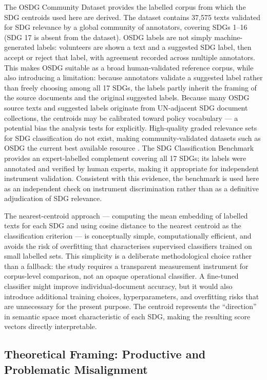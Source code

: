 \documentclass[12pt,a4paper]{article}
\begin{document}
The OSDG Community Dataset \parencite{Pukelis2022} provides the labelled corpus from which the SDG centroids used here are derived. The dataset contains 37,575 texts validated for SDG relevance by a global community of annotators, covering SDGs 1--16 (SDG 17 is absent from the dataset). OSDG labels are not simply machine-generated labels: volunteers are shown a text and a suggested SDG label, then accept or reject that label, with agreement recorded across multiple annotators. This makes OSDG suitable as a broad human-validated reference corpus, while also introducing a limitation: because annotators validate a suggested label rather than freely choosing among all 17 SDGs, the labels partly inherit the framing of the source documents and the original suggested labels. Because many OSDG source texts and suggested labels originate from UN-adjacent SDG document collections, the centroids may be calibrated toward policy vocabulary --- a potential bias the analysis tests for explicitly. High-quality graded relevance sets for SDG classification do not exist, making community-validated datasets such as OSDG the current best available resource \parencite{Kashnitsky2024}. The SDG Classification Benchmark \parencite{SDGBenchmark} provides an expert-labelled complement covering all 17 SDGs; its labels were annotated and verified by human experts, making it appropriate for independent instrument validation. Consistent with this evidence, the benchmark is used here as an independent check on instrument discrimination rather than as a definitive adjudication of SDG relevance.

The nearest-centroid approach --- computing the mean embedding of labelled texts for each SDG and using cosine distance to the nearest centroid as the classification criterion --- is conceptually simple, computationally efficient, and avoids the risk of overfitting that characterises supervised classifiers trained on small labelled sets. This simplicity is a deliberate methodological choice rather than a fallback: the study requires a transparent measurement instrument for corpus-level comparison, not an opaque operational classifier. A fine-tuned classifier might improve individual-document accuracy, but it would also introduce additional training choices, hyperparameters, and overfitting risks that are unnecessary for the present purpose. The centroid represents the ``direction'' in semantic space most characteristic of each SDG, making the resulting score vectors directly interpretable.

\subsection{Theoretical Framing: Productive and Problematic Misalignment}
\end{document}
